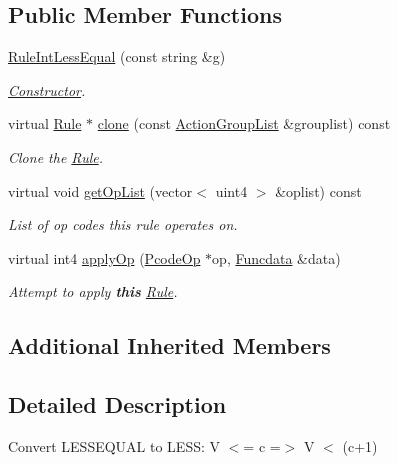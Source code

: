 \subsection*{Public Member Functions}
\begin{DoxyCompactItemize}
\item 
\mbox{\hyperlink{class_rule_int_less_equal_affb9c411f4c5f329b64131241a7ec1a1}{Rule\+Int\+Less\+Equal}} (const string \&g)
\begin{DoxyCompactList}\small\item\em \mbox{\hyperlink{class_constructor}{Constructor}}. \end{DoxyCompactList}\item 
virtual \mbox{\hyperlink{class_rule}{Rule}} $\ast$ \mbox{\hyperlink{class_rule_int_less_equal_a81819aa711a35d88d8f0f7d9e5aad3e3}{clone}} (const \mbox{\hyperlink{class_action_group_list}{Action\+Group\+List}} \&grouplist) const
\begin{DoxyCompactList}\small\item\em Clone the \mbox{\hyperlink{class_rule}{Rule}}. \end{DoxyCompactList}\item 
virtual void \mbox{\hyperlink{class_rule_int_less_equal_a1926c44b4c14298c375989f03264a4ee}{get\+Op\+List}} (vector$<$ uint4 $>$ \&oplist) const
\begin{DoxyCompactList}\small\item\em List of op codes this rule operates on. \end{DoxyCompactList}\item 
virtual int4 \mbox{\hyperlink{class_rule_int_less_equal_a94fea35e74d0c34edf0da67dd56cb8e6}{apply\+Op}} (\mbox{\hyperlink{class_pcode_op}{Pcode\+Op}} $\ast$op, \mbox{\hyperlink{class_funcdata}{Funcdata}} \&data)
\begin{DoxyCompactList}\small\item\em Attempt to apply {\bfseries{this}} \mbox{\hyperlink{class_rule}{Rule}}. \end{DoxyCompactList}\end{DoxyCompactItemize}
\subsection*{Additional Inherited Members}


\subsection{Detailed Description}
Convert L\+E\+S\+S\+E\+Q\+U\+AL to L\+E\+SS\+: {\ttfamily V $<$= c =$>$ V $<$ (c+1)} 

